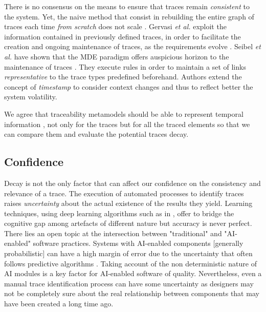 There is no consensus on the means to ensure that traces remain \textit{consistent} to the system. Yet, the naive method that consist in rebuilding the entire graph of traces each time \textit{from scratch} does not scale \cite{seibel2012-efficient-traceability-for-MDE}. Gervasi \textit{et al.} exploit the information contained in previously defined traces, in order to facilitate the creation and ongoing maintenance of traces, as the requirements evolve \cite{gervasi2014-maintenance-coevolution-with-affinity}. 
Seibel \textit{et al.} have shown that the MDE paradigm offers auspicious horizon to the maintenance of traces \cite{seibel2012-efficient-traceability-for-MDE}. They execute rules in order to maintain a set of links \textit{representative} to the trace types predefined beforehand. Authors extend the concept of \textit{timestamp} to consider context changes and thus to reflect better the system volatility.

We agree that traceability metamodels should be able to represent temporal information \cite{CabotOT03}, not only for the traces but for all the traced elements so that we can compare them and evaluate the potential traces decay. 


\subsection{Confidence}

Decay is not the only factor that can affect our confidence on the consistency and relevance of a trace. The execution of automated processes to identify traces raises \textit{uncertainty} about the actual existence of the results they yield. Learning techniques, using deep learning algorithms such as in \cite{guo2017-semantically-enhanced-tracebility-deep-learning}, offer to bridge the cognitive gap among artefacts of different nature but accuracy is never perfect.
There lies an open topic at the intersection between "traditional" and "AI-enabled" software practices. Systems with AI-enabled components [generally probabilistic] can have a high margin of error due to the uncertainty that often follows predictive algorithms \cite{ozkaya2020-differences-in-AI-enabled-engineering}. Taking account of the non deterministic nature of AI modules is a key factor for AI-enabled software of quality. Nevertheless, even a manual trace identification process can have some uncertainty as designers may not be completely sure about the real relationship between components that may have been created a long time ago. 

